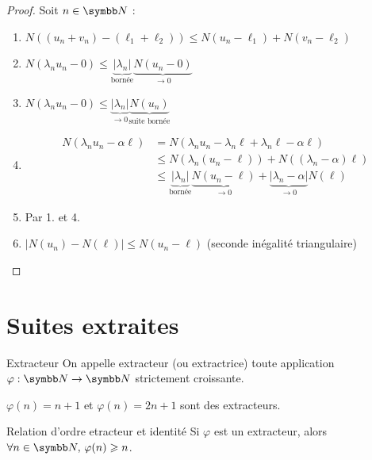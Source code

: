 \begin{proof}
    Soit $n \in \N$ :
    \begin{enumerate}
        \item $N((u_n + v_n) - (\ell_1 + \ell_2)) \leqslant N(u_n - \ell_1) + N(v_n - \ell_2)$
        \item $N(\lambda_n u_n- 0) \leqslant \underbrace{|\lambda_n|}_{\text{bornée}} \underbrace{N(u_n - 0)}_{\rightarrow 0}$
        \item $N(\lambda_n u_n - 0) \leqslant \underbrace{|\lambda_n|}_{\rightarrow 0} \underbrace{N(u_n)}_{\text{suite bornée}}$
        \item 
        \begin{align*}
            N(\lambda_n u_n - \alpha \ell) & = N(\lambda_n u_n - \lambda_n \ell + \lambda_n \ell - \alpha \ell) \\
            & \leqslant N(\lambda_n (u_n - \ell)) + N((\lambda_n - \alpha) \ell) \\
            & \leqslant \underbrace{|\lambda_n|}_{\text{bornée}} \underbrace{N(u_n - \ell)}_{\rightarrow 0} + \underbrace{|\lambda_n - \alpha|}_{\rightarrow 0} N(\ell) 
        \end{align*}
        \item Par 1. et 4.
        \item $|N(u_n) - N(\ell)| \leqslant N(u_n - \ell)$ (seconde inégalité triangulaire)
    \end{enumerate}
\end{proof}

\section{Suites extraites}
\begin{definition}{Extracteur}{}
    On appelle extracteur (ou extractrice) toute application $\varphi : \N \to \N$ strictement croissante.
\end{definition}

\begin{exemple}
    $\varphi (n) = n +1$ et $\varphi (n) = 2n + 1$ sont des extracteurs.    
\end{exemple}

\begin{proposition}{Relation d'ordre etracteur et identité}{}
    Si $\varphi$ est un extracteur, alors $\forall n \in \N, \, \varphi(n) \geqslant n$.
\end{proposition}



